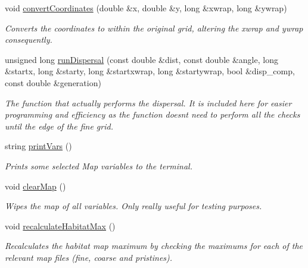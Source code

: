 \begin{DoxyCompactItemize}
void \hyperlink{class_landscape_af5ba56f29b355c5dd7226231144d147e}{convert\+Coordinates} (double \&x, double \&y, long \&xwrap, long \&ywrap)
\begin{DoxyCompactList}\small\item\em Converts the coordinates to within the original grid, altering the xwrap and ywrap consequently. \end{DoxyCompactList}\item 
unsigned long \hyperlink{class_landscape_aedc33de89997456d53cceb3e4e424e64}{run\+Dispersal} (const double \&dist, const double \&angle, long \&startx, long \&starty, long \&startxwrap, long \&startywrap, bool \&disp\+\_\+comp, const double \&generation)
\begin{DoxyCompactList}\small\item\em The function that actually performs the dispersal. It is included here for easier programming and efficiency as the function doesn\textquotesingle{}t need to perform all the checks until the edge of the fine grid. \end{DoxyCompactList}\item 
string \hyperlink{class_landscape_a9b867a59c88f754bae6788451845b698}{print\+Vars} ()
\begin{DoxyCompactList}\small\item\em Prints some selected Map variables to the terminal. \end{DoxyCompactList}\item 
void \hyperlink{class_landscape_a28d01a593cbaf9d8fde9c2e1da996f91}{clear\+Map} ()\hypertarget{class_landscape_a28d01a593cbaf9d8fde9c2e1da996f91}{}\label{class_landscape_a28d01a593cbaf9d8fde9c2e1da996f91}

\begin{DoxyCompactList}\small\item\em Wipes the map of all variables. Only really useful for testing purposes. \end{DoxyCompactList}\item 
void \hyperlink{class_landscape_abaf14ac4da88cd26f6593bdaa88d999f}{recalculate\+Habitat\+Max} ()\hypertarget{class_landscape_abaf14ac4da88cd26f6593bdaa88d999f}{}\label{class_landscape_abaf14ac4da88cd26f6593bdaa88d999f}

\begin{DoxyCompactList}\small\item\em Recalculates the habitat map maximum by checking the maximums for each of the relevant map files (fine, coarse and pristines). \end{DoxyCompactList}\end{DoxyCompactItemize}
